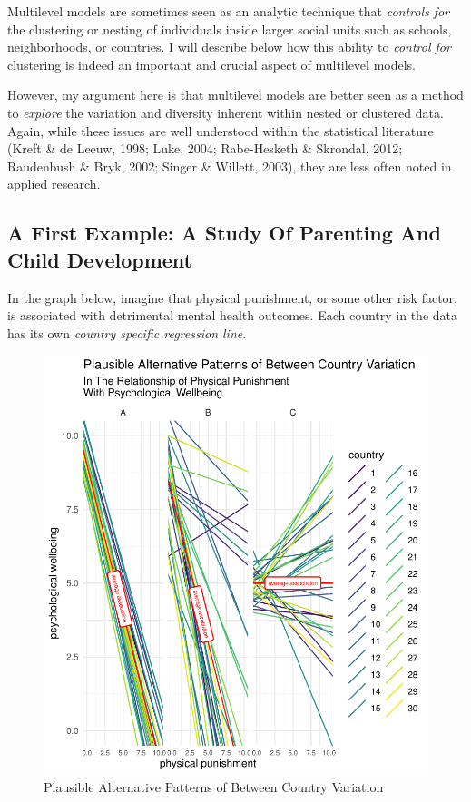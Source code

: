 \documentclass[
  letterpaper,
  DIV=11,
  numbers=noendperiod]{scrreprt}
\begin{document}
Multilevel models are sometimes seen as an analytic technique that
\emph{controls for} the clustering or nesting of individuals inside
larger social units such as schools, neighborhoods, or countries. I will
describe below how this ability to \emph{control for} clustering is
indeed an important and crucial aspect of multilevel models.

However, my argument here is that multilevel models are better seen as a
method to \emph{explore} the variation and diversity inherent within
nested or clustered data. Again, while these issues are well understood
within the statistical literature (Kreft \& de Leeuw, 1998; Luke, 2004;
Rabe-Hesketh \& Skrondal, 2012; Raudenbush \& Bryk, 2002; Singer \&
Willett, 2003), they are less often noted in applied research.

\hypertarget{a-first-example-a-study-of-parenting-and-child-development}{%
\subsection{A First Example: A Study Of Parenting And Child
Development}\label{a-first-example-a-study-of-parenting-and-child-development}}

In the graph below, imagine that physical punishment, or some other risk
factor, is associated with detrimental mental health outcomes. Each
country in the data has its own \emph{country specific regression line}.

\begin{figure}

{\centering \includegraphics{conceptual-framework_files/figure-pdf/fig-variation1-1.pdf}

}

\caption{\label{fig-variation1}Plausible Alternative Patterns of Between
Country Variation}

\end{figure}
\end{document}
